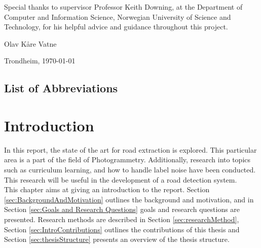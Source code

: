 \documentclass[a4paper]{book}
\newcommand{\thesisAuthor}{Olav Kåre Vatne}
\begin{document}
Special thanks to supervisor Professor Keith Downing, at the Department of Computer
and Information Science, Norwegian University of Science and Technology, for his
helpful advice and guidance throughout this project. \\



\vfill

\hfill \thesisAuthor

\hfill Trondheim, \today

\clearpage

\section*{List of Abbreviations}
\vspace{1cm}
\begin{acronym}
\end{acronym}



\tableofcontents

\listoffigures

\listoftables


\mainmatter



\chapter{Introduction}
\label{cha:Introduction}
In this report, the state of the art for road extraction is explored. This particular area is a part of the field of Photogrammetry. Additionally, research into topics such as curriculum learning, and how to handle label noise have been conducted. This research will be useful in the development of a road detection system.\\

This chapter aims at giving an introduction to the report. Section \ref{sec:BackgroundAndMotivation} outlines the background and motivation, and in Section \ref{sec:Goals and Research Questions} goals and research questions are presented. Research methods are described in Section \ref{sec:researchMethod}, Section \ref{sec:IntroContributions} outlines the contributions of this thesis and Section \ref{sec:thesisStructure} presents an overview of the thesis structure.
\end{document}
